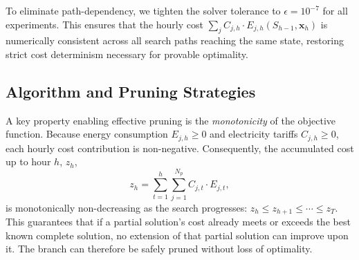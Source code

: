 \documentclass[final,3p,twocolumn]{elsarticle}
\begin{document}
To eliminate path-dependency, we tighten the solver tolerance to $\epsilon = 10^{-7}$ for all experiments. This ensures that the hourly cost $\sum_j C_{j,h} \cdot E_{j,h}(S_{h-1}, \mathbf{x}_h)$ is numerically consistent across all search paths reaching the same state, restoring strict cost determinism necessary for provable optimality.

\subsection{Algorithm and Pruning Strategies}

A key property enabling effective pruning is the \emph{monotonicity} of the objective function. Because energy consumption $E_{j,h} \ge 0$ and electricity tariffs $C_{j,h} \ge 0$, each hourly cost contribution is non-negative. Consequently, the accumulated cost up to hour $h$, $z_h$,
\[
	z_h = \sum_{t=1}^{h} \sum_{j=1}^{N_p} C_{j,t} \cdot E_{j,t},
\]
is monotonically non-decreasing as the search progresses: $z_h \le z_{h+1} \le \cdots \le z_T$. This guarantees that if a partial solution's cost already meets or exceeds the best known complete solution, no extension of that partial solution can improve upon it. The branch can therefore be safely pruned without loss of optimality.
\end{document}
